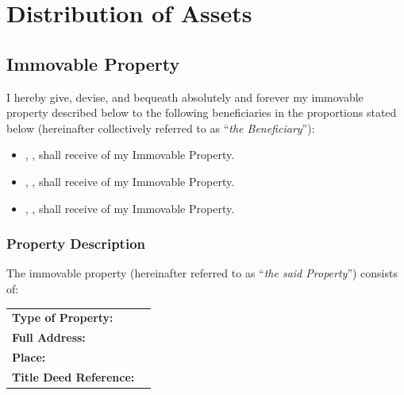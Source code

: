 
\section{Distribution of Assets}
\label{sec:assets}

\subsection{Immovable Property}
I hereby give, devise, and bequeath absolutely and forever my immovable property described below to the following beneficiaries in the proportions stated below (hereinafter collectively referred to as “\textit{the Beneficiary}”):

\begin{itemize}
  \item \FirstBeneficiaryName{}, \FirstBeneficiaryRelationship{}, shall receive \FirstBeneficiaryFraction{} of my Immovable Property.
  \item \SecondBeneficiaryName{}, \SecondBeneficiaryRelationship{}, shall receive \SecondBeneficiaryFraction{} of my Immovable Property.
  \item \ThirdBeneficiaryName{}, \ThirdBeneficiaryRelationship{}, shall receive \ThirdBeneficiaryFraction{} of my Immovable Property.
\end{itemize}

\subsubsection*{Property Description}
The immovable property (hereinafter referred to as “\textit{the said Property}”) consists of:

\vspace{0.2cm}

\noindent
\begin{tabular}{p{8cm} p{8cm}}
\textbf{Type of Property:} & \PropertyType{} \\ 
\textbf{Full Address:} & \PropertyAddress{} \\ 
\textbf{Place:} & \PropertyLocation{} \\ 
\textbf{Title Deed Reference:} & \PropertyDeed{} \\ 
\end{tabular}

